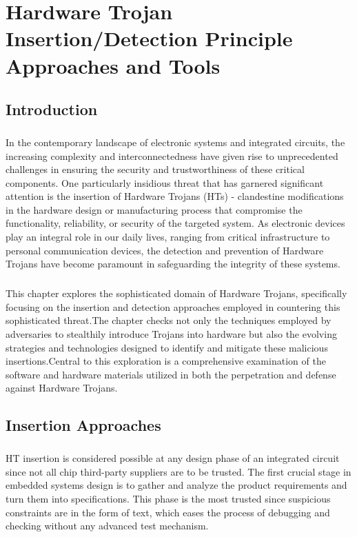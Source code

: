 \chapter{Hardware Trojan Insertion/Detection Principle Approaches and Tools}
\section{Introduction}
\paragraph*{}
In the contemporary landscape of electronic systems and integrated circuits, the increasing complexity and interconnectedness have given rise to unprecedented challenges in ensuring the security and trustworthiness of these critical components. One particularly insidious threat that has garnered significant attention is the insertion of Hardware Trojans (HTs) - clandestine modifications in the hardware design or manufacturing process that compromise the functionality, reliability, or security of the targeted system. As electronic devices play an integral role in our daily lives, ranging from critical infrastructure to personal communication devices, the detection and prevention of Hardware Trojans have become paramount in safeguarding the integrity of these systems.
\paragraph*{}
This chapter explores the sophisticated domain of Hardware Trojans, specifically focusing on the insertion and detection approaches employed in countering this sophisticated threat.The chapter checks not only the techniques employed by adversaries to stealthily introduce Trojans into hardware but also the evolving strategies and technologies designed to identify and mitigate these malicious insertions.Central to this exploration is a comprehensive examination of the software and hardware materials utilized in both the perpetration and defense against Hardware Trojans.
\section{Insertion Approaches}
\paragraph*{}
HT insertion is considered possible at any design phase of an integrated circuit since not all chip third-party suppliers are to be trusted. The first crucial stage in embedded systems design is to gather and analyze the product requirements and turn them into specifications. This phase is the most trusted since suspicious constraints are in the form of text, which eases the process of debugging and checking without any advanced test mechanism.
